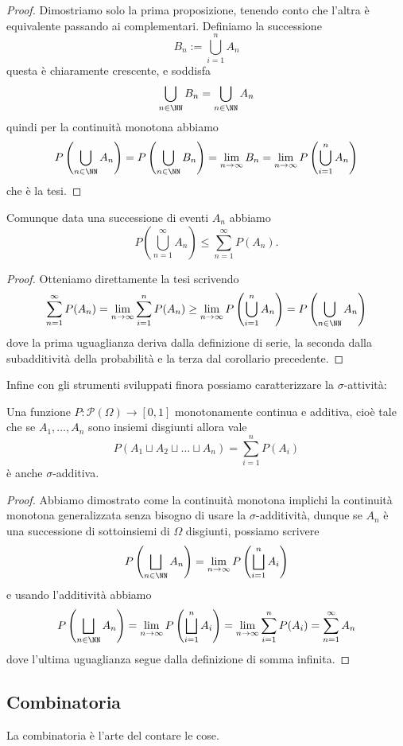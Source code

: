 \documentclass[11pt]{scrartcl}
\newcommand{\parti}[1]{\mathcal{P}\!\left(#1\right)}
\begin{document}
	\begin{proof}
		Dimostriamo solo la prima proposizione, tenendo conto che l'altra è equivalente passando ai complementari. Definiamo la successione
		$$B_n:=\bigcup_{i=1}^n A_n$$
		questa è chiaramente crescente, e soddisfa
		$$\bigcup_{n\in \NN}B_n=\bigcup_{n\in \NN}A_n$$
		quindi per la continuità monotona abbiamo
		$$P\left(\bigcup_{n\in \NN}A_n\right)=P\left(\bigcup_{n\in \NN}B_n\right)=\lim_{n\to \infty}B_n= \lim_{n\to \infty}P\left(\bigcup_{i=1}^nA_n\right)$$
		che è la tesi.
	\end{proof}
	\begin{corollary}
		Comunque data una successione di eventi $A_n$ abbiamo
		$$P\left(\bigcup_{n=1}^{\infty}A_n\right)\le \sum_{n=1}^{\infty}P(A_n).$$
	\end{corollary}
	\begin{proof}
		Otteniamo direttamente la tesi scrivendo
		$$\sum_{n=1}^\infty P(A_n)=\lim_{n\to\infty}\sum_{i=1}^{n}P(A_n)\ge\lim_{n\to\infty}P\left(\bigcup_{i=1}^n A_n\right)=P\left(\bigcup_{n\in \NN}A_n\right)$$
		dove la prima uguaglianza deriva dalla definizione di serie, la seconda dalla subadditività della probabilità e la terza dal corollario precedente.
	\end{proof}
	Infine con gli strumenti sviluppati finora possiamo caratterizzare la $\sigma$-attività:
	\begin{theorem}
		Una funzione $P:\parti{\Omega}\to [0,1]$ monotonamente continua e additiva, cioè tale che se $A_1,\dots,A_n$ sono insiemi disgiunti allora vale
		$$P\left(A_1\sqcup A_2\sqcup \dots \sqcup A_n\right)=\sum_{i=1}^{n}P(A_i)$$
		è anche $\sigma$-additiva. 
	\end{theorem}
	\begin{proof}
		Abbiamo dimostrato come la continuità monotona implichi la continuità monotona generalizzata senza bisogno di usare la $\sigma$-additività, dunque se $A_n$ è una successione di sottoinsiemi di $\Omega$ disgiunti, possiamo scrivere
		$$P\left(\bigsqcup_{n\in \NN}A_n\right)=\lim_{n\to \infty}P\left(\bigsqcup_{i=1}^nA_i\right)$$
		e usando l'additività abbiamo
		$$P\left(\bigsqcup_{n\in \NN}A_n\right)=\lim_{n\to \infty}P\left(\bigsqcup_{i=1}^nA_i\right)=\lim_{n\to\infty}\sum_{i=1}^{n}P(A_i)=\sum_{n=1}^{\infty}A_n$$
		dove l'ultima uguaglianza segue dalla definizione di somma infinita.
	\end{proof}
	\subsection{Combinatoria}
	La combinatoria è l'arte del contare le cose.
	
\end{document}
